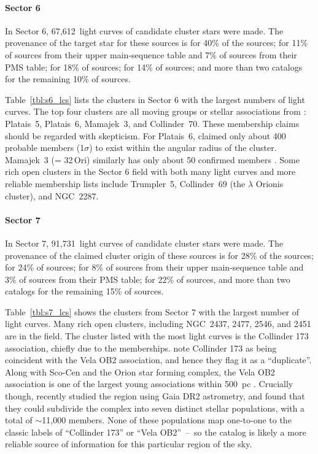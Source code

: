 \documentclass[12pt,twocolumn,tighten,trackchanges]{aastex62}
\newcommand{\sVInumberlcs}{67{,}612\ }  %
\newcommand{\sVIInumberlcs}{91{,}731\ }  %
\begin{document}
\paragraph{Sector 6}

In Sector 6, \sVInumberlcs light curves of candidate cluster stars
were made. The provenance of the target star for these sources is
\citet{dias_proper_2014} for 40\% of the sources; \citet{zari_3d_2018}
for 11\% of sources from their upper main-sequence table and 7\% of
sources from their PMS table; \citet{Kharchenko_et_al_2013} for 18\%
of sources; \citet{cantat-gaudin_gaia_2018} for 14\% of sources; and
more than two catalogs for the remaining 10\% of sources.

Table~\ref{tbl:s6_lcs} lists the clusters in Sector 6 with the largest
numbers of light curves. The top four clusters are all moving groups
or stellar associations from \citet{dias_proper_2014}: Platais~5,
Platais~6, Mamajek~3, and Collinder~70.  These membership claims
should be regarded with skepticism.  For Platais~6,
\citet{Kharchenko_et_al_2013} claimed only about 400 probable members
(1$\sigma$) to exist within the angular radius of the cluster.
Mamajek~3 (= 32$\,$Ori) similarly has only about 50 confirmed members
\citep{bell_32ori_2017}.  Some rich open clusters in the Sector 6
field with both many light curves and more reliable membership lists
include Trumpler~5, Collinder~69 (the $\lambda$ Orionis cluster), and
NGC~2287.


\paragraph{Sector 7}

In Sector 7, \sVIInumberlcs light curves of candidate cluster stars
were made.  The provenance of the claimed cluster origin of these
sources is \citet{dias_proper_2014} for 28\% of the sources;
\citet{Kharchenko_et_al_2013} for 24\% of sources;
\citet{zari_3d_2018} for 8\% of sources from their upper main-sequence
table and 3\% of sources from their PMS table;
\citet{cantat-gaudin_gaia_2018} for 22\% of sources, and more than two
catalogs for the remaining 15\% of sources.

Table~\ref{tbl:s7_lcs} shows the clusters from Sector 7 with the
largest number of light curves.  Many rich open clusters, including
NGC~2437, 2477, 2546, and 2451 are in the field.  The cluster listed
with the most light curves is the Collinder 173 association, chiefly
due to the \citet{dias_proper_2014} memberships.
\citet{Kharchenko_et_al_2013} note Collinder 173 as being coincident
with the Vela OB2 association, and hence they flag it as a
``duplicate''.  Along with Sco-Cen and the Orion star forming complex,
the Vela OB2 association is one of the largest young associations
within 500~pc \citep{zari_3d_2018}.  Crucially though,
\citet{cantat-gaudin_velaOB2_2019} recently studied the region using
Gaia DR2 astrometry, and found that they could subdivide the complex
into seven distinct stellar populations, with a total of $\sim$11,000
members.  None of these populations map one-to-one to the classic
labels of ``Collinder 173'' or ``Vela OB2''~--~so the
\citet{cantat-gaudin_velaOB2_2019} catalog is likely a more reliable
source of information for this particular region of the sky.
\end{document}
